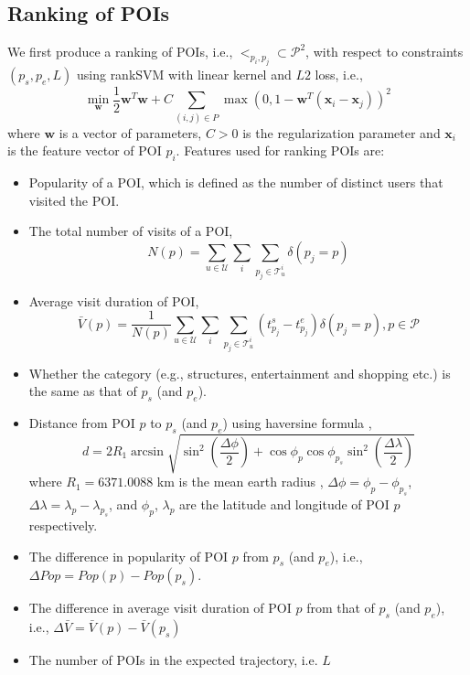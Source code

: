 \documentclass{sig-alternate-05-2015}
\begin{document}
\subsection{Ranking of POIs}
We first produce a ranking of POIs, i.e., $<_{p_i, p_j} \subset \mathcal{P}^2$,
with respect to constraints $(p_s, p_e, L)$ 
using rankSVM with linear kernel and $L2$ loss\cite{lranksvm}, 
i.e.,
\begin{displaymath}
\min_{\mathbf{w}} \frac{1}{2} \mathbf{w}^T \mathbf{w} +
                  C \sum_{(i, j) \in P} \max \left( 0, 1 - \mathbf{w}^T (\mathbf{x}_i - \mathbf{x}_j) \right)^2
\end{displaymath}
where $\mathbf{w}$ is a vector of parameters, 
$C > 0$ is the regularization parameter and 
$\mathbf{x}_i$ is the feature vector of POI $p_i$.
Features used for ranking POIs are:
\begin{itemize}
\item Popularity of a POI, which is defined as the number of distinct users that visited the POI\cite{ht10}.
\item The total number of visits of a POI,
      \begin{displaymath}
          N(p) = \sum_{u \in \mathcal{U}} \sum_i \sum_{p_j \in \mathcal{T}_u^i} \delta(p_j = p)
      \end{displaymath}
\item Average visit duration of POI\cite{ijcai15},
      \begin{displaymath}
          \bar{V}(p) = \frac{1}{N(p)} \sum_{u \in \mathcal{U}} \sum_i \sum_{p_j \in \mathcal{T}_u^i} (t_{p_j}^s - t_{p_j}^e) \delta(p_j = p),
          p \in \mathcal{P}
      \end{displaymath}
\item Whether the category (e.g., structures, entertainment and shopping etc.) is the same as that of $p_s$ (and $p_e$).
\item Distance from POI $p$ to $p_s$ (and $p_e$) using haversine formula \cite{wiki_haversine},
      \begin{displaymath}
      d = 2 R_1 \arcsin \sqrt{ \sin^2 \left( \frac{\Delta \phi}{2} \right) + 
           \cos \phi_p \cos \phi_{p_s} \sin^2 \left( \frac{\Delta \lambda}{2} \right) }
      \end{displaymath}
            where $R_1 = 6371.0088$ km is the mean earth radius \cite{wiki_earth_radius}, 
            $\Delta \phi = \phi_p - \phi_{p_s}$, $\Delta \lambda = \lambda_p - \lambda_{p_s}$,
            and $\phi_p$, $\lambda_p$ are the latitude and longitude of POI $p$ respectively.
\item The difference in popularity of POI $p$ from $p_s$ (and $p_e$),
      i.e., $\Delta Pop = Pop(p) - Pop(p_s)$.
\item The difference in average visit duration of POI $p$ from that of $p_s$ (and $p_e$),
      i.e., $\Delta \bar{V} = \bar{V}(p) - \bar{V}(p_s)$
\item The number of POIs in the expected trajectory, i.e. $L$
\end{itemize}
\end{document}
